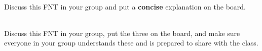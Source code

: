 \WCD\\

\begin{fnt}
	
\end{fnt}

\noindent Discuss this FNT in your group and put a \textbf{concise} explanation on the board.\\

\WCD\\

\begin{fnt}
	
\end{fnt}

\noindent Discuss this FNT in your group, put the three \forcediags{} on the board, and make sure everyone in your group understands these and is prepared to share with the class.\\

\WCD